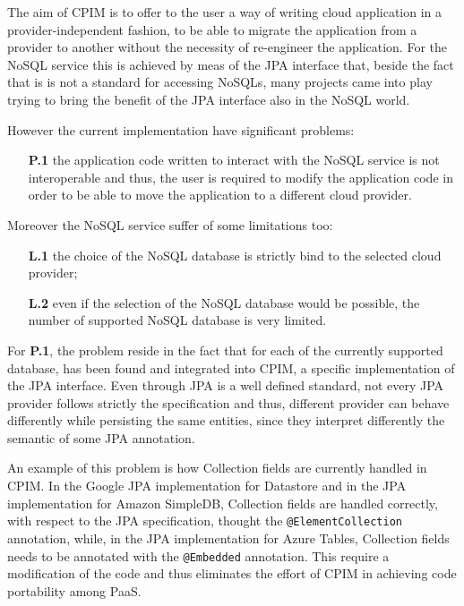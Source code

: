 \newparagraph The aim of CPIM is to offer to the user a way of writing cloud application in a provider-independent fashion, to be able to migrate the application from a provider to another without the necessity of re-engineer the application. For the NoSQL service this is achieved by meas of the JPA interface that, beside the fact that is is not a standard for accessing NoSQLs, many projects came into play trying to bring the benefit of the JPA interface also in the NoSQL world. 

\noindent However the current implementation have significant problems:
\begin{enumerate}
\item[\textbf{P.1}] the application code written to interact with the NoSQL service is not interoperable and thus, the user is required to modify the application code in order to be able to move the application to a different cloud provider.  
\end{enumerate}
\noindent Moreover the NoSQL service suffer of some limitations too:
\begin{enumerate}
\item[\textbf{L.1}] the choice of the NoSQL database is strictly bind to the selected cloud provider; 
\item[\textbf{L.2}] even if the selection of the NoSQL database would be possible, the number of supported NoSQL database is very limited.
\end{enumerate}

\noindent For \textbf{P.1}, the problem reside in the fact that for each of the currently supported database, has been found and integrated into CPIM, a specific implementation of the JPA interface. Even through JPA is a well defined standard, not every JPA provider follows strictly the specification and thus, different provider can behave differently while persisting the same entities, since they interpret differently the semantic of some JPA annotation.

\noindent An example of this problem is how Collection fields are currently handled in CPIM. In the Google JPA implementation for Datastore and in the JPA implementation for Amazon SimpleDB, Collection fields are handled correctly, with respect to the JPA specification, thought the \texttt{@ElementCollection} annotation, while, in the JPA implementation for Azure Tables, Collection fields needs to be annotated with the \texttt{@Embedded} annotation. This require a modification of the code and thus eliminates the effort of CPIM in achieving code portability among PaaS.

